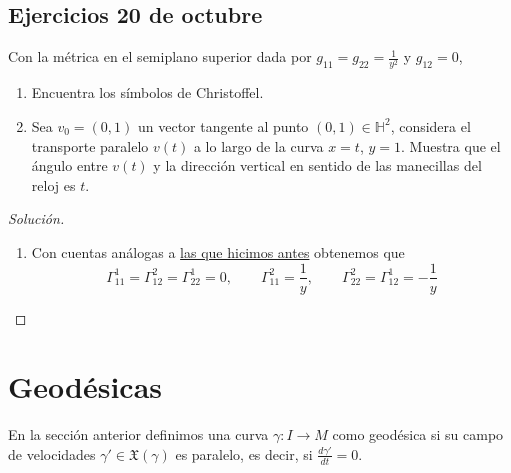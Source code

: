 \documentclass[spanish]{book}
\theoremstyle{definition}
\newcommand{\Hy}{\mathbb{H}}
\newcommand{\X}{\mathfrak{X}}
\DeclareMathOperator{\sen}{sen}
\begin{document}
	\subsection{Ejercicios 20 de octubre}
	Con la métrica en el semiplano superior dada por $g_{11}=g_{22}=\frac{1}{y^2}$ y $g_{12}=0$,
	\begin{enumerate}
		\item Encuentra los símbolos de Christoffel.
		\item Sea $v_0=(0,1)$ un vector tangente al punto $(0,1)\in\Hy^2$, considera el transporte paralelo $v(t)$ a lo largo de la curva $x=t$, $y=1$. Muestra que el ángulo entre $v(t)$ y la dirección vertical en sentido de las manecillas del reloj es $t$.
	\end{enumerate}
	\begin{proof}[Solución]\leavevmode
		\begin{enumerate}
			\item Con cuentas análogas a \hyperref[ejem:chsitorffel-hip]{las que hicimos antes} obtenemos que
		\[\Gamma^1_{11}=\Gamma^2_{12}=\Gamma^1_{22}=0,\qquad \Gamma_{11}^2=\frac{1}{y},\qquad \Gamma_{22}^2=\Gamma^1_{12}=-\frac{1}{y}\]
		\end{enumerate}
	\end{proof}
	
	\section{Geodésicas}
	En la sección anterior definimos una curva $\gamma:I\to M$ como geodésica si su campo de velocidades $\gamma'\in\X(\gamma)$ es paralelo, es decir, si $\frac{d\gamma'}{dt}=0$.
	
\end{document}
